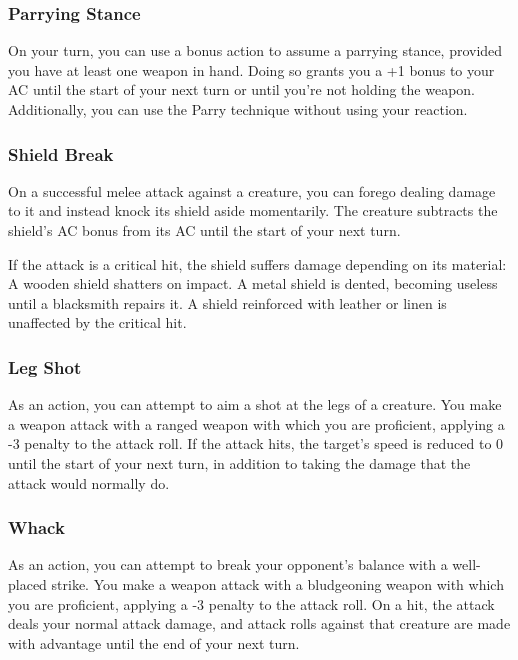 \subsubsection{Parrying Stance} \label{tec::parryingstance}
On your turn, you can use a bonus action to assume a parrying stance, provided you have at least one weapon in hand.
Doing so grants you a +1 bonus to your AC until the start of your next turn or until you're not holding the weapon.
Additionally, you can use the Parry technique without using your reaction.

\subsubsection{Shield Break} \label{tec::shieldbreak}
On a successful melee attack against a creature, you can forego dealing damage to it and instead knock its shield aside momentarily.
The creature subtracts the shield's AC bonus from its AC until the start of your next turn.

If the attack is a critical hit, the shield suffers damage depending on its material:
A wooden shield shatters on impact.
A metal shield is dented, becoming useless until a blacksmith repairs it.
A shield reinforced with leather or linen is unaffected by the critical hit.

\subsubsection{Leg Shot} \label{tec::legshot}
As an action, you can attempt to aim a shot at the legs of a creature.
You make a weapon attack with a ranged weapon with which you are proficient, applying a -3 penalty to the attack roll.
If the attack hits, the target's speed is reduced to 0 until the start of your next turn, in addition to taking the damage that the attack would normally do.

\subsubsection{Whack} \label{tec::whack}
As an action, you can attempt to break your opponent's balance with a well-placed strike.
You make a weapon attack with a bludgeoning weapon with which you are proficient, applying a -3 penalty to the attack roll.
On a hit, the attack deals your normal attack damage, and attack rolls against that creature are made with advantage until the end of your next turn.

